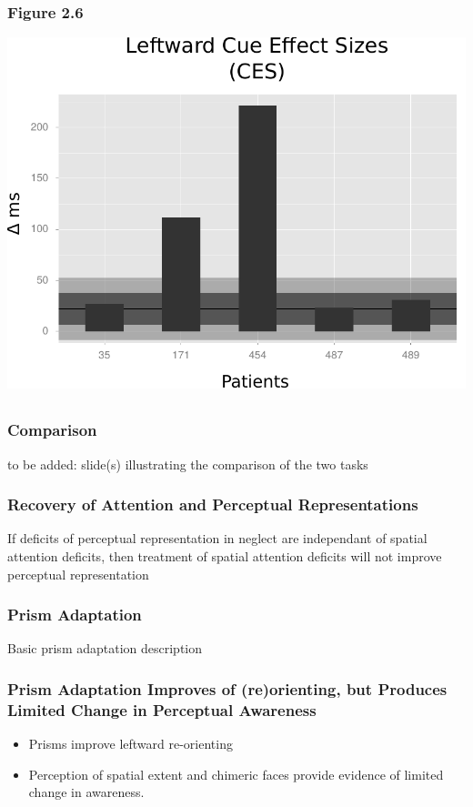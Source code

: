 \documentclass{beamer}
\begin{document}

\subsection*{}
\begin{frame}
	\frametitle{Comparison}
	to be added: slide(s) illustrating the comparison of the two tasks
\end{frame}

\begin{frame}
	\frametitle{Recovery of Attention and Perceptual Representations}
	If deficits of perceptual representation in neglect are independant of spatial attention deficits,
	then treatment of spatial attention deficits will not improve perceptual representation
\end{frame}

\begin{frame}
	\frametitle{Prism Adaptation}
	Basic prism adaptation description
\end{frame}

\begin{frame}
	\frametitle{Prism Adaptation Improves of (re)orienting, but Produces Limited Change in Perceptual Awareness}
	\begin{itemize}
		\item Prisms improve leftward re-orienting
		\item Perception of spatial extent and chimeric faces provide evidence of limited change in awareness.
	\end{itemize}
\end{frame}
\end{document}
